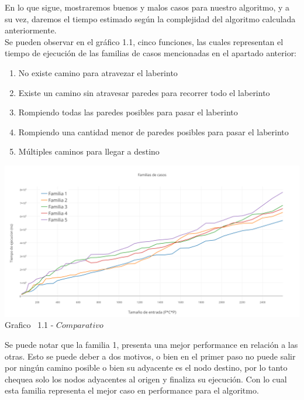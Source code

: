 \indent En lo que sigue, mostraremos buenos y malos casos para nuestro algoritmo, y a su vez, daremos el tiempo estimado 
seg\'un la complejidad del algoritmo calculada anteriormente.\\

Se pueden observar en el  gráfico 1.1, cinco funciones, las cuales representan el tiempo de ejecuci\'on de las familias de casos mencionadas en el apartado anterior:\\

\begin{enumerate}
\item No existe camino para atravezar el laberinto
\item Existe un camino sin atravesar paredes para recorrer todo el laberinto
\item Rompiendo todas las paredes posibles para pasar el laberinto
\item Rompiendo una cantidad menor de paredes posibles para pasar el laberinto
\item Múltiples caminos para llegar a destino
\end{enumerate}

\vspace*{0.3cm} \vspace*{0.3cm}
  \begin{center}
 \includegraphics[scale=0.5]{./EJ1/comparativo.png}
 {Grafico \ 1.1 - $Comparativo$}
  \end{center}
  \vspace*{0.3cm}
  
Se puede notar que la familia 1, presenta una mejor performance en relaci\'on a las otras. Esto se puede deber a dos motivos, o bien en el primer paso no puede salir por ning\'un camino posible o bien su adyacente es el nodo destino, por lo tanto chequea solo los nodos adyacentes al origen y finaliza su ejecuci\'on. Con lo cual esta familia representa el mejor caso en performance para el algoritmo.

